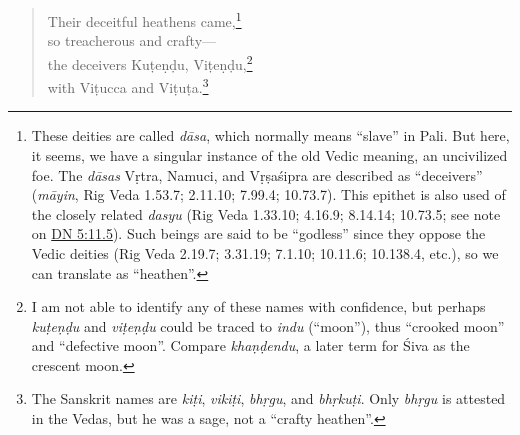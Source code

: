 \documentclass[12pt,openany]{book}%
\begin{document}
\begin{verse}
Their deceitful heathens came,\footnote{These deities are called \textit{\textsanskrit{dāsa}}, which normally means “slave” in Pali. But here, it seems, we have a singular instance of the old Vedic meaning, an uncivilized foe. The \textit{\textsanskrit{dāsas}} \textsanskrit{Vṛtra}, Namuci, and \textsanskrit{Vṛṣaśipra} are described as “deceivers” (\textit{\textsanskrit{māyin}}, Rig Veda 1.53.7; 2.11.10; 7.99.4; 10.73.7). This epithet is also used of the closely related \textit{dasyu} (Rig Veda 1.33.10; 4.16.9; 8.14.14; 10.73.5; see note on \href{https://suttacentral.net/dn5/en/sujato\#11.5}{DN 5:11.5}). Such beings are said to be “godless” since they oppose the Vedic deities (Rig Veda 2.19.7; 3.31.19; 7.1.10; 10.11.6; 10.138.4, etc.), so we can translate as “heathen”. } \\
so treacherous and crafty—\\
the deceivers \textsanskrit{Kuṭeṇḍu}, \textsanskrit{Viṭeṇḍu},\footnote{I am not able to identify any of these names with confidence, but perhaps \textit{\textsanskrit{kuṭeṇḍu}} and \textit{\textsanskrit{viṭeṇḍu}} could be traced to \textit{indu} (“moon”), thus “crooked moon” and “defective moon”. Compare \textit{\textsanskrit{khaṇḍendu}}, a later term for Śiva as the crescent moon. } \\
with \textsanskrit{Viṭucca} and \textsanskrit{Viṭuṭa}.\footnote{The Sanskrit names are \textit{\textsanskrit{kiṭi}}, \textit{\textsanskrit{vikiṭi}}, \textit{\textsanskrit{bhṛgu}}, and \textit{\textsanskrit{bhṛkuṭi}}. Only \textit{\textsanskrit{bhṛgu}} is attested in the Vedas, but he was a sage, not a “crafty heathen”. } 


\end{verse}
\end{document}
